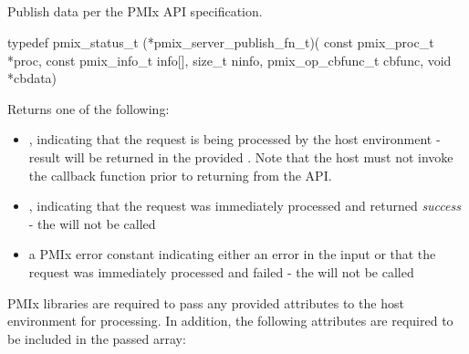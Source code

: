 \subsection{}

\summary

Publish data per the PMIx API specification.

\format

\cspecificstart
\begin{codepar}
typedef pmix_status_t (*pmix_server_publish_fn_t)(
                             const pmix_proc_t *proc,
                             const pmix_info_t info[],
                             size_t ninfo,
                             pmix_op_cbfunc_t cbfunc,
                             void *cbdata)
\end{codepar}
\cspecificend

\begin{arglist}
\end{arglist}

Returns one of the following:

\begin{itemize}
    \item {}, indicating that the request is being processed by the host environment - result will be returned in the provided . Note that the host must not invoke the callback function prior to returning from the \ac{API}.
    \item {}, indicating that the request was immediately processed and returned \textit{success} - the  will not be called
    \item a PMIx error constant indicating either an error in the input or that the request was immediately processed and failed - the  will not be called
\end{itemize}

\reqattrstart
\ac{PMIx} libraries are required to pass any provided attributes to the host environment for processing. In addition, the following attributes are required to be included in the passed  array:

